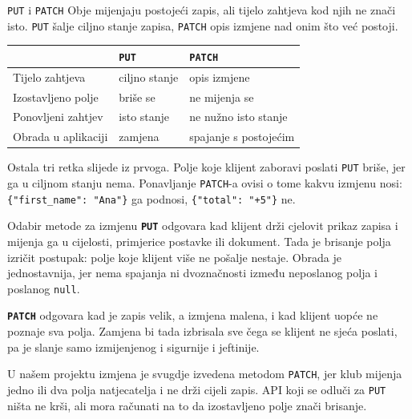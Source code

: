 
\begin{frame}{\texttt{PUT} i \texttt{PATCH}}
Obje mijenjaju postojeći zapis, ali tijelo zahtjeva kod njih ne znači isto. \texttt{PUT} šalje ciljno stanje zapisa, \texttt{PATCH} opis izmjene nad onim što već postoji.

\vspace{0.9em}
\begin{center}
{\small
\setlength{\tabcolsep}{10pt}
\renewcommand{\arraystretch}{1.3}
\begin{tabular}{@{}lll@{}}
  \toprule
   & \textbf{\texttt{PUT}} & \textbf{\texttt{PATCH}} \\
  \midrule
  Tijelo zahtjeva     & ciljno stanje & opis izmjene \\
  Izostavljeno polje  & briše se      & ne mijenja se \\
  Ponovljeni zahtjev  & isto stanje   & ne nužno isto stanje \\
  Obrada u aplikaciji & zamjena       & spajanje s postojećim \\
  \bottomrule
\end{tabular}
}
\end{center}

\vspace{0.9em}
Ostala tri retka slijede iz prvoga. Polje koje klijent zaboravi poslati \texttt{PUT} briše, jer ga u ciljnom stanju nema. Ponavljanje \texttt{PATCH}-a ovisi o tome kakvu izmjenu nosi: \texttt{\{"first\_name": "Ana"\}} ga podnosi, \texttt{\{"total": "+5"\}} ne.
\end{frame}

\begin{frame}{Odabir metode za izmjenu}
\textbf{\texttt{PUT}} odgovara kad klijent drži cjelovit prikaz zapisa i mijenja ga u cijelosti, primjerice postavke ili dokument. Tada je brisanje polja izričit postupak: polje koje klijent više ne pošalje nestaje. Obrada je jednostavnija, jer nema spajanja ni dvoznačnosti između neposlanog polja i poslanog \texttt{null}.

\vspace{0.25em}
\textbf{\texttt{PATCH}} odgovara kad je zapis velik, a izmjena malena, i kad klijent uopće ne poznaje sva polja. Zamjena bi tada izbrisala sve čega se klijent ne sjeća poslati, pa je slanje samo izmijenjenog i sigurnije i jeftinije.

\vspace{0.25em}
\begin{konvencija}
U našem projektu izmjena je svugdje izvedena metodom \texttt{PATCH}, jer klub mijenja jedno ili dva polja natjecatelja i ne drži cijeli zapis. API koji se odluči za \texttt{PUT} ništa ne krši, ali mora računati na to da izostavljeno polje znači brisanje.
\end{konvencija}
\end{frame}

